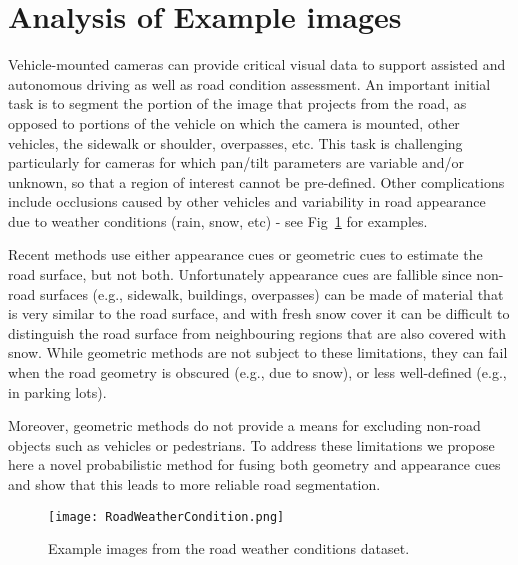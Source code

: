 \documentclass[10pt,twocolumn,letterpaper]{article}
\begin{document}
\section{Analysis of Example images}
Vehicle-mounted cameras can provide critical visual data to support assisted and autonomous driving as well as road condition assessment. An important initial task is to segment the portion of the image that projects from the road, as opposed to portions of the vehicle on which the camera is mounted, other vehicles, the sidewalk or shoulder, overpasses, etc. This task is challenging particularly for cameras
for which pan/tilt parameters are variable and/or unknown,
so that a region of interest cannot be pre-defined. Other
complications include occlusions caused by other vehicles
and variability in road appearance due to weather conditions
(rain, snow, etc) - see Fig~\ref{fig:RoadWeatherCondition} for examples.\par
\cite{Cheng_2017_ICCV_Workshops}Recent methods use either appearance cues or geometric cues to estimate the road surface, but not both. Unfortunately appearance cues are fallible since non-road surfaces (e.g., sidewalk, buildings, 
 overpasses) can be made of material that is very similar to the road surface, and with fresh snow cover it can be difficult to distinguish the road surface from neighbouring regions that are also covered with snow. While geometric methods are not subject to these limitations, they can fail when the road geometry is obscured (e.g., due to snow), or less well-defined (e.g., in parking lots). \par
 Moreover, geometric methods do not provide a means for excluding non-road objects such as vehicles or pedestrians. To address these limitations we propose here a novel probabilistic method for fusing both geometry and appearance cues and show that this leads to more reliable road segmentation.\par
\begin{figure}[t]
\begin{center}

\texttt{[image: RoadWeatherCondition.png]}
\end{center}
   \caption{Example images from the road weather conditions dataset.}
\label{fig:RoadWeatherCondition}
\end{figure}
\end{document}
